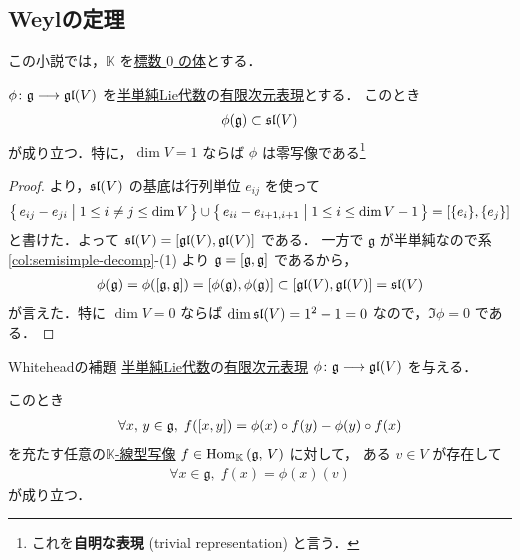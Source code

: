 \documentclass[rep_main]{subfiles}
\begin{document}
\subsection{Weylの定理}

この小説では，$\mathbb{K}$ を\underline{標数 $0$ の体}とする．

\begin{mylem}[label=lem:Weyl]{}
	$\phi \colon \mathfrak{g} \longrightarrow \mathfrak{gl} (V)$ を\hyperref[def:semisimple-LieAlg]{半単純Lie代数}の\underline{有限次元}\hyperref[ax:g-module]{表現}とする．
	このとき
	\begin{align}
		\phi(\mathfrak{g}) \subset \mathfrak{sl} (V)
	\end{align}
	が成り立つ．特に，$\dim V = 1$ ならば $\phi$ は零写像である\footnote{これを\textbf{自明な表現} (trivial representation) と言う．}
\end{mylem}

\begin{proof}
	より，$\mathfrak{sl} (V)$ の基底は行列単位 $e_{ij}$ を使って
	\begin{align}
		\bigl\{\, e_{ij} - e_{ji} \bigm| 1 \le i\neq j \le \dim V \,\bigr\} \cup \bigl\{\, e_{ii} - e_{i+1,i+1} \bigm| 1 \le i \le \dim V - 1 \,\bigr\} = \comm{\{e_i\}}{\{e_j\}}
	\end{align}
	と書けた．よって $\Lsl (V) = \comm{\Lgl(V)}{\Lgl(V)}$ である．
	一方で $\mathfrak{g}$ が半単純なので系\ref{col:semisimple-decomp}-(1) より $\mathfrak{g} = \comm{\mathfrak{g}}{\mathfrak{g}}$ であるから，
	\begin{align}
		\phi(\mathfrak{g}) = \phi(\comm{\mathfrak{g}}{\mathfrak{g}}) = \comm{\phi(\mathfrak{g})}{\phi(\mathfrak{g})} \subset \comm{\Lgl(V)}{\Lgl(V)} = \Lsl(V)
	\end{align}
	が言えた．特に $\dim V = 0$ ならば $\dim \mathfrak{sl}(V) = 1^2 - 1 = 0$ なので，$\Im \phi = 0$ である． 
\end{proof}

\begin{mylem}[label=lem:Whitehead]{Whiteheadの補題}
	\hyperref[def:semisimple-LieAlg]{半単純Lie代数}の\underline{有限次元}\hyperref[ax:g-module]{表現} $\phi \colon \mathfrak{g} \longrightarrow \mathfrak{gl} (V)$ を与える．
	
	このとき
	\begin{align}
		\label{eq:cocycle}
		\forall x,\, y \in \mathfrak{g},\; f(\comm{x}{y}) = \phi(x) \circ f(y) - \phi(y) \circ f(x)
	\end{align}
	を充たす任意の\underline{$\mathbb{K}$-線型写像} $f \in \mathrm{Hom}_{\mathbb{K}} \mathop{}(\mathfrak{g},\, V)$ に対して，
	ある $v \in V$ が存在して
	\begin{align}
		\forall x \in \mathfrak{g},\; f(x) = \phi(x)(v)
	\end{align}
	が成り立つ．
\end{mylem}
\end{document}

